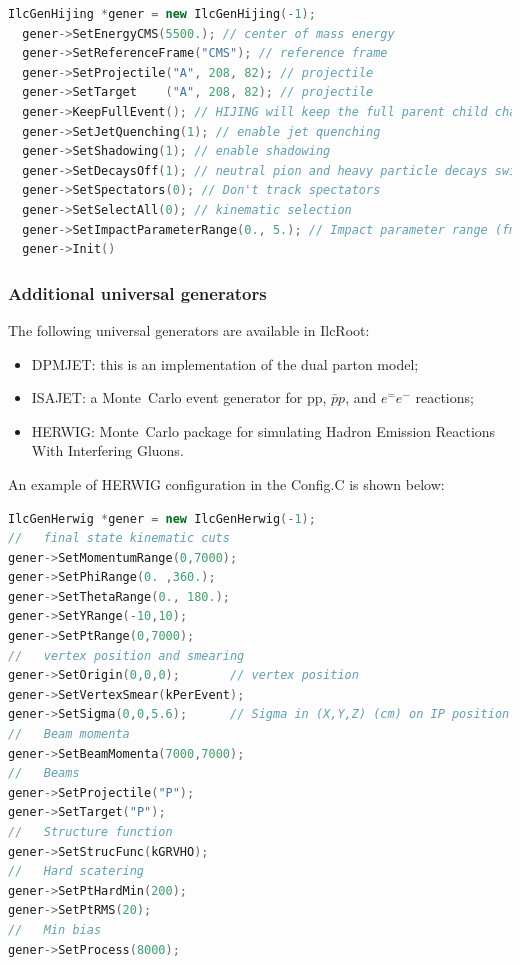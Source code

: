 \documentclass[12pt,a4paper,twoside]{article}
\makeatletter
\newcommand {\MC} {Monte~Carlo\@\xspace}
\makeatother
\begin{document}
\begin{lstlisting}[language=C++]
  IlcGenHijing *gener = new IlcGenHijing(-1);
  gener->SetEnergyCMS(5500.); // center of mass energy 
  gener->SetReferenceFrame("CMS"); // reference frame
  gener->SetProjectile("A", 208, 82); // projectile
  gener->SetTarget    ("A", 208, 82); // projectile
  gener->KeepFullEvent(); // HIJING will keep the full parent child chain
  gener->SetJetQuenching(1); // enable jet quenching
  gener->SetShadowing(1); // enable shadowing
  gener->SetDecaysOff(1); // neutral pion and heavy particle decays switched off
  gener->SetSpectators(0); // Don't track spectators
  gener->SetSelectAll(0); // kinematic selection
  gener->SetImpactParameterRange(0., 5.); // Impact parameter range (fm)
  gener->Init()
\end{lstlisting}

\subsubsection{Additional universal generators}

The following universal generators are available in IlcRoot:

\begin{itemize}
\item DPMJET: this is an implementation of the dual parton
  model\cite{MC:DPMJET};
\item ISAJET: a \MC event generator for pp, $\bar pp$, and $e^=e^-$
  reactions\cite{MC:ISAJET};
\item HERWIG:  \MC package for simulating Hadron Emission
  Reactions With Interfering Gluons\cite{MC:HERWIG}.
\end{itemize}

An example of HERWIG configuration in the Config.C is shown below:
\begin{lstlisting}[language=C++]
IlcGenHerwig *gener = new IlcGenHerwig(-1);
//   final state kinematic cuts
gener->SetMomentumRange(0,7000);
gener->SetPhiRange(0. ,360.);
gener->SetThetaRange(0., 180.);
gener->SetYRange(-10,10);
gener->SetPtRange(0,7000);
//   vertex position and smearing 
gener->SetOrigin(0,0,0);       // vertex position
gener->SetVertexSmear(kPerEvent);
gener->SetSigma(0,0,5.6);      // Sigma in (X,Y,Z) (cm) on IP position
//   Beam momenta
gener->SetBeamMomenta(7000,7000);
//   Beams
gener->SetProjectile("P");
gener->SetTarget("P");
//   Structure function
gener->SetStrucFunc(kGRVHO);
//   Hard scatering
gener->SetPtHardMin(200);
gener->SetPtRMS(20);
//   Min bias
gener->SetProcess(8000);
\end{lstlisting}
\end{document}
